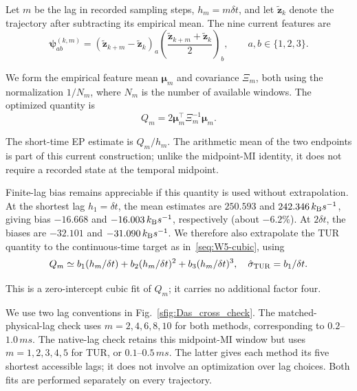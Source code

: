 \documentclass[
 longbibliography,
 twocolumn,
 superscriptaddress,
 amsmath,
 amssymb,
 amsthm,
 amsfonts,
 prl,
 floatfix,
]{revtex4-2}
\newcommand{\matbf}[1]{\boldsymbol{\mathsf{#1}}}
\begin{document}
\begin{widetext}
Let $m$ be the lag in recorded sampling steps, $h_m=m\delta t$, and let $\tilde{\bm z}_k$ denote the trajectory after subtracting its empirical
mean. The nine current features are
\[
    \bm\psi_{ab}^{(k,m)}=
    (\tilde{\bm z}_{k+m} -\tilde{\bm z}_k)_a\left(\frac{\tilde{\bm z}_{k+m} +\tilde{\bm z}_k}{2}\right)_b,
    \qquad
    a,b\in\{1,2,3\}.
\]

We form the empirical feature mean $\bm\mu_m$ and covariance $\matbf\Xi_m$, both using the normalization $1/N_m$, where $N_m$ is the number of available windows. The optimized quantity is
\begin{equation}
    Q_m=2\bm\mu_m^\intercal\matbf\Xi_m^{-1}\bm\mu_m.
    \label{seq:das_estimator}
\end{equation}

The short-time EP estimate is $Q_m/h_m$. The arithmetic mean of the two endpoints is part of this current construction; unlike the midpoint-MI identity, it does not require a recorded state at the temporal midpoint.

Finite-lag bias remains appreciable if this quantity is used without extrapolation. At the shortest lag $h_1=\delta t$, the mean estimates are $250.593$ and $242.346\,k_{\rm B}s^{-1}$, giving bias $-16.668$ and $-16.003\,k_{\rm B}s^{-1}$, respectively (about $-6.2\%$). At $2\delta t$, the biases are $-32.101$ and $-31.090\,k_{\rm B}s^{-1}$. We therefore also extrapolate the TUR quantity to the continuous-time target as in~\eqref{seq:W5-cubic}, using
\[
    Q_m\simeq b_{1}(h_m/\delta t)+b_{2}(h_m/\delta t)^2+b_{3}(h_m/\delta t)^3,
    \quad
    \hat\sigma_{\rm TUR}=b_{1}/\delta t.
\]

This is a zero-intercept cubic fit of $Q_m$; it carries no additional factor four.

We use two lag conventions in Fig.~\ref{sfig:Das_cross_check}. The matched-physical-lag check uses $m=2,4,6,8,10$ for both methods, corresponding to $0.2$--$1.0\,ms$. The native-lag check retains this midpoint-MI window but uses $m=1,2,3,4,5$ for TUR, or $0.1$--$0.5\,ms$. The latter gives each method its five shortest accessible lags; it does not involve an optimization over lag choices. Both fits are performed separately on every trajectory.


\end{widetext}
\end{document}

